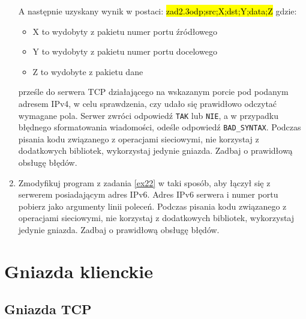 \documentclass{article}
\newcommand{\hlc}[2][shadecolor]{ 	{\sethlcolor{#1} \hl{#2}} }
\begin{document}
\begin{enumerate}[label=\textbf{2.\arabic*}]
\noindent A następnie uzyskany wynik w postaci: \hlc[shadecolor]{ zad2.3odp;src;X;dst;Y;data;Z } gdzie:

\begin{itemize}
\item X to wydobyty z pakietu numer portu źródłowego
\item Y to wydobyty z pakietu numer portu docelowego
\item Z to wydobyte z pakietu dane 
\end{itemize}

 prześle do serwera TCP działającego na wskazanym porcie pod podanym adresem IPv4, w celu sprawdzenia, czy udało się prawidłowo odczytać wymagane pola. Serwer zwróci odpowiedź \texttt{TAK} lub \texttt{NIE}, a w przypadku błędnego sformatowania wiadomości, odeśle odpowiedź \texttt{BAD\_SYNTAX}.  Podczas pisania kodu związanego z operacjami sieciowymi, nie korzystaj z dodatkowych bibliotek, wykorzystaj jedynie gniazda. Zadbaj o prawidłową obsługę błędów. 
 

  \item Zmodyfikuj program z zadania \ref{ex22} w taki sposób,  aby łączył się z serwerem posiadającym adres IPv6.  Adres IPv6 serwera i numer portu pobierz jako argumenty linii poleceń. Podczas pisania kodu związanego z operacjami sieciowymi, nie korzystaj z dodatkowych bibliotek, wykorzystaj jedynie gniazda. Zadbaj o prawidłową obsługę błędów. 

\end{enumerate}

\newpage
\section{Gniazda klienckie}




\subsection*{Gniazda TCP}
\end{document}
